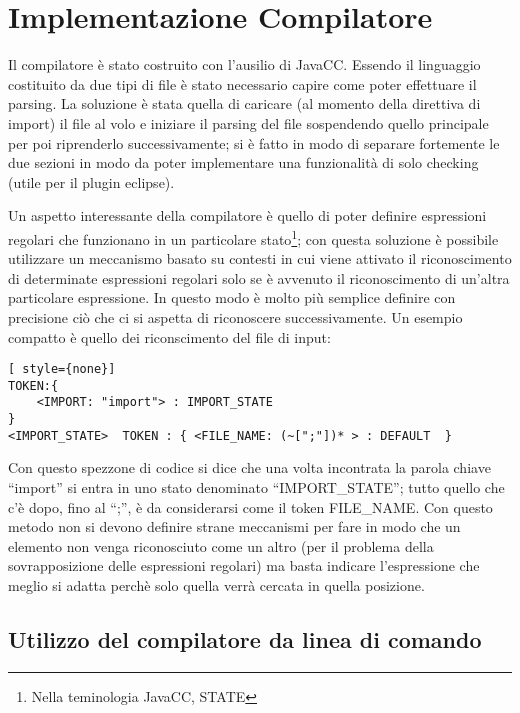 \section{Implementazione Compilatore}

Il compilatore è stato costruito con l'ausilio di JavaCC\cite{javacc_website:11}\cite{javacc_faq:13}\cite{javacc_lexer:14}. Essendo il linguaggio
costituito da due tipi di file è stato necessario capire come poter effettuare
il parsing. La soluzione è stata quella di caricare (al momento della direttiva
di import) il file al volo e iniziare il parsing del file sospendendo
quello principale per poi riprenderlo successivamente; si è fatto in modo di
separare fortemente le due sezioni in modo da poter implementare una
funzionalità di solo checking (utile per il plugin eclipse).


Un aspetto interessante della compilatore è quello di poter definire espressioni
regolari che funzionano in un particolare stato\footnote{Nella teminologia
JavaCC, STATE}\cite{javacc_state:12}; con questa soluzione è
possibile utilizzare un meccanismo basato su contesti in cui viene attivato il
riconoscimento di determinate espressioni regolari solo se è avvenuto il
riconoscimento di un'altra particolare espressione. In questo modo è molto più
semplice definire con precisione ciò che ci si aspetta di riconoscere
successivamente. Un esempio compatto è quello dei riconscimento del file di
input: 


\begin{lstlisting}[ style={none}]
TOKEN:{
	<IMPORT: "import"> : IMPORT_STATE
}
<IMPORT_STATE>  TOKEN : { <FILE_NAME: (~[";"])* > : DEFAULT  }
\end{lstlisting}

Con questo spezzone di codice si dice che una volta incontrata la parola chiave
``import'' si entra in uno stato denominato ``IMPORT\_STATE''; tutto quello che
c'è dopo, fino al ``;'', è da considerarsi come il token FILE\_NAME. Con questo
metodo non si devono definire strane meccanismi per fare in modo che un elemento non
venga riconosciuto come un altro (per il problema della sovrapposizione delle
espressioni regolari) ma basta indicare l'espressione che meglio si adatta
perchè solo quella verrà cercata in quella posizione.

\subsection{Utilizzo del compilatore da linea di comando}

